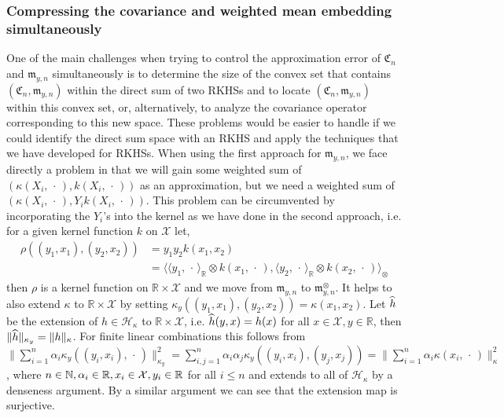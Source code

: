 \documentclass[AHL,Unicode,longabstracts,published]{cedram}
\theoremstyle{remark}
\newcommand{\R}{\mathbb{R}}
\newcommand{\bbN}{\mathbb{N}}
\newcommand{\X}{\mathcal{X}}
\newcommand{\cH}{\mathcal{H}}
\newcommand{\fkC}{\mathfrak{C}}
\newcommand{\mean}{\mathfrak{m}}
\let\oldhat\hat
\renewcommand*{\hat}[1]{\mathchoice{\widehat{#1}}{\widehat{#1}}{\oldhat{#1}}{\oldhat{#1}}}
\begin{document}
\subsubsection{Compressing the covariance and weighted mean embedding simultaneously} One of the main challenges when trying to control the approximation error of $\fkC_n$ and $\mean_{y,n}$ simultaneously is to determine the size of the convex set that contains $(\fkC_n,\mean_{y,n})$ within the direct sum of two RKHSs and to locate $(\fkC_n,\mean_{y,n})$ within this convex set, or, alternatively, to analyze the covariance operator corresponding to this new space. These problems would be easier to handle if we could identify the direct sum space with an RKHS and apply the techniques that we have developed for RKHSs. When using the first approach for $\mean_{y,n}$, we face directly a problem in that we will gain some weighted sum of $(\kappa(X_i,\,\cdot\,),k(X_i,\,\cdot\,))$ as an approximation, but we need a weighted sum of $(\kappa(X_i,\,\cdot\,),Y_i k(X_i,\,\cdot\,))$. This problem can be circumvented by incorporating the $Y_i$'s into the kernel as we have done in the second approach, i.e. for a given kernel function $k$ on $\X$ let,
\begin{equation}\label{eq:def_rho}
\begin{aligned}
\rho((y_1,x_1),(y_2,x_2)) &= y_1 y_2 k(x_1,x_2)\\ 
&= \bigl\langle \langle y_1, \,\cdot\, \rangle_\R \otimes k(x_1,\,\cdot\,),\langle y_2, \,\cdot\, \rangle_\R \otimes k(x_2,\,\cdot\,)\bigr\rangle_\otimes
\end{aligned}
\end{equation}
then $\rho$ is a kernel function on $\R\times \X$ and we move from $\mean_{y,n}$ to $\mean_{y,n}^\otimes$. It helps to also extend $\kappa$ to $\R\times \X$ by setting $\kappa_y((y_1,x_1),(y_2,x_2)) = \kappa(x_1,x_2)$. Let $\hat h$ be the extension of $h \in \cH_\kappa$ to $\R \times \X$, i.e. $\hat h(y,x) = h(x)$ for all $x\in \X,y\in\R$, then $\|\hat h\|_{\kappa_y} = \|h\|_{\kappa}$. For finite linear combinations this follows from $\|\sum_{i=1}^n \alpha_i \kappa_y((y_i,x_i),\,\cdot\,)\|^2_{\kappa_y} = \sum_{i,j=1}^n \alpha_i \alpha_j \kappa_y((y_i,x_i), (y_j,x_j)) = \|\sum_{i=1}^n \alpha_i \kappa(x_i,\,\cdot\,)\|^2_\kappa$, where $n\in \bbN, \alpha_i \in \R, x_i\in \X,\linebreak y_i \in \R$ for all $i\leq n$ and extends to all of $\cH_\kappa$ by a denseness argument. By a similar argument we can see that the extension map is surjective.
\end{document}
